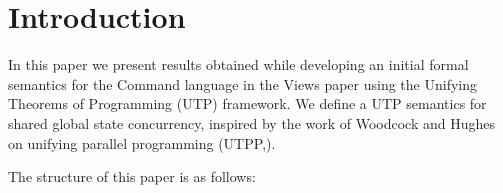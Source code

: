 \section{Introduction}\label{sec:intro}



In this paper we present results obtained while developing
an initial formal semantics for the Command language
in the Views paper \cite{conf/popl/Dinsdale-YoungBGPY13}
using the
Unifying Theorems of Programming (UTP) framework\cite{Hoare-He98}.
We define a UTP semantics for  shared global state concurrency,
inspired by the work of Woodcock and Hughes on unifying parallel programming (UTPP,\cite{DBLP:conf/icfem/WoodcockH02}).


The structure of this paper is as follows:
